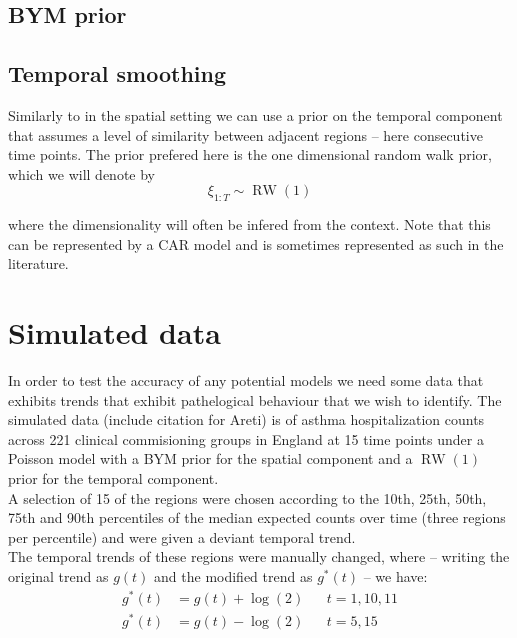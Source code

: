 \documentclass{article}
\begin{document}
\subsection{BYM prior}

\subsection{Temporal smoothing}

Similarly to in the spatial setting we can use a prior on the temporal component that assumes a level of similarity between adjacent regions -- here consecutive time points. The prior prefered here is the one dimensional random walk prior, which we will denote by
\begin{equation}
\xi_{1:T} \sim \operatorname{RW}(1)
\end{equation}

where the dimensionality will often be infered from the context. Note that this can be represented by a CAR model and is sometimes represented as such in the literature. 

\section{Simulated data}

In order to test the accuracy of any potential models we need some data that exhibits trends that exhibit pathelogical behaviour that we wish to identify. The simulated data (include citation for Areti) is of asthma hospitalization counts across 221 clinical commisioning groups in England at 15 time points under a Poisson model with a BYM prior for the spatial component and a $\operatorname{RW}(1)$ prior for the temporal component. \\

A selection of 15 of the regions were chosen according to the 10th, 25th, 50th, 75th and 90th percentiles of the median expected counts over time (three regions per percentile) and were given a deviant temporal trend. \\

The temporal trends of these regions were manually changed, where -- writing the original trend as $g(t)$ and the modified trend as $g^*(t)$ -- we have:
\begin{align}
g^*(t) &= g(t) + \log(2) && t = 1, 10, 11 \\ 
g^*(t) &= g(t) - \log(2) && t = 5, 15
\end{align}
\end{document}

